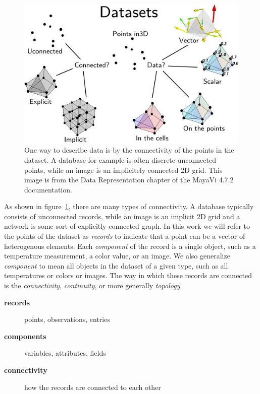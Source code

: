 \documentclass[../main.tex]{subfiles}
\begin{document}
\begin{figure}[H]
    \includegraphics[width=1\textwidth]{figures/intro/dataset_diagram.png}
    \caption{One way to describe data is by the connectivity of the points in the dataset. A database for example is often discrete unconnected points, while an image is an implicitely connected 2D grid. This image is from the Data Representation chapter of the MayaVi 4.7.2 documentation.\cite{DataRepresentationMayavi}}
    \label{fig:intro_data_format}
\end{figure}
As shown in figure~\ref{fig:intro_data_format}, there are many types of connectivity. A database typically consists of unconnected records, while an image is an implicit 2D grid and a network is some sort of explicitly connected graph.  In this work we will refer to the points of the dataset as \textit{records} to indicate that a point can be a vector of heterogenous elements. Each \textit{component} of the record is a single object, such as a temperature measurement, a color value, or an image. We also generalize \textit{component} to mean all objects in the dataset of a given type, such as all temperatures or colors or images. The way in which these records are connected is the \textit{connectivity}, \textit{continuity}, or more generally \textit{topology}.

\begin{mdframed}[roundcorner=10pt, frametitle= definitions, frametitlerule=true, frametitlebackgroundcolor=gray!10]
    \begin{description}
        \item[\textbf{records}] points, observations, entries 
        \item[\textbf{components}] variables, attributes, fields 
        \item[\textbf{connectivity}] how the records are connected to each other
    \end{description}
\end{mdframed}
\end{document}

